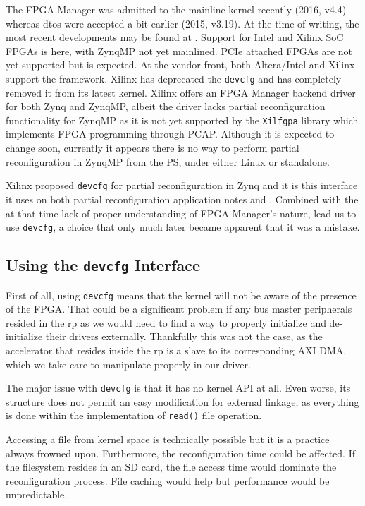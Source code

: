 The FPGA Manager was admitted to the mainline kernel recently (2016, v4.4) whereas \glspl{dto} were accepted a bit earlier (2015, v3.19).
At the time of writing, the most recent developments may be found at \cite{fpgamanagerwhatsnew}. 
Support for Intel and Xilinx SoC FPGAs is here, with ZynqMP not yet mainlined. PCIe attached FPGAs are not yet supported but is expected.
At the vendor front, both Altera/Intel and Xilinx support the framework. Xilinx has deprecated the \texttt{devcfg} and has
completely removed it from its latest kernel. 
Xilinx offers an FPGA Manager backend driver for both Zynq and ZynqMP, 
albeit the driver lacks partial reconfiguration functionality for ZynqMP as it is not yet supported by the \texttt{Xilfgpa} library
which implements FPGA programming through PCAP.
Although it is expected to change soon, currently it appears there is no way to perform partial reconfiguration in ZynqMP from the PS,
under either Linux or standalone.

Xilinx proposed \texttt{devcfg} for partial reconfiguration in Zynq and it is this interface it uses 
on both partial reconfiguration application notes \cite{xapp1231} and \cite{xapp1159}.
Combined with the at that time lack of proper understanding of FPGA Manager's nature,
lead us to use \texttt{devcfg}, a choice that only much later became apparent that it was a mistake.

\subsection{Using the \texttt{devcfg} Interface}

First of all, using \texttt{devcfg} means that the kernel will not be aware of the presence of the FPGA.
That could be a significant problem if any bus master peripherals resided in the \gls{rp} as we would need to find a way
to properly initialize and de-initialize their drivers externally. Thankfully this was not the case, as the accelerator
that resides inside the \gls{rp} is a slave to its corresponding AXI DMA, which we take care to manipulate properly in our driver.

The major issue with \texttt{devcfg} is that it has no kernel API at all. Even worse, its structure does not permit
an easy modification for external linkage, as everything is done within the implementation of \texttt{read()} file operation.

Accessing a file from kernel space is technically possible but it is a practice always frowned upon. 
Furthermore, the reconfiguration time could be affected. If the filesystem resides in an SD card, the file access time would dominate
the reconfiguration process. File caching would help but performance would be unpredictable.

